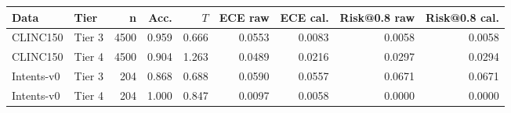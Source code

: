 \begin{tabular}{llrrrrrrr}
\toprule
Data & Tier & n & Acc. & $T$ & ECE raw & ECE cal. & Risk@0.8 raw & Risk@0.8 cal. \\
\midrule
CLINC150 & Tier 3 & 4500 & 0.959 & 0.666 & 0.0553 & 0.0083 & 0.0058 & 0.0058 \\
CLINC150 & Tier 4 & 4500 & 0.904 & 1.263 & 0.0489 & 0.0216 & 0.0297 & 0.0294 \\
Intents-v0 & Tier 3 & 204 & 0.868 & 0.688 & 0.0590 & 0.0557 & 0.0671 & 0.0671 \\
Intents-v0 & Tier 4 & 204 & 1.000 & 0.847 & 0.0097 & 0.0058 & 0.0000 & 0.0000 \\
\bottomrule
\end{tabular}
